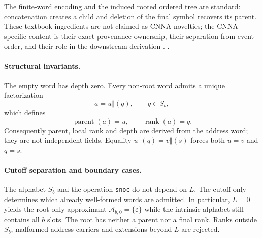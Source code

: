The finite-word encoding and the induced rooted ordered tree are standard:
concatenation creates a child and deletion of the final symbol recovers its
parent.  These textbook ingredients are not claimed as CNNA novelties; the
CNNA-specific content is their exact provenance ownership, their separation
from event order, and their role in the downstream derivation
\cite[Ch.~1 and free-monoid background]{Lothaire1997CombinatoricsWords}.
\cite[Ch.~1, The Basics]{Diestel2025GraphTheory}.

\paragraph*{Structural invariants.}
The empty word has depth zero.  Every non-root word admits a unique
factorization
\begin{equation}
  a=u\mathbin{\Vert}(q),
  \qquad q\in S_b,
  \label{eq:c003-unique-decomposition}
\end{equation}
which defines
\begin{equation}
  \operatorname{parent}(a)=u,
  \qquad \operatorname{rank}(a)=q.
  \label{eq:c003-parent-rank}
\end{equation}
Consequently parent, local rank and depth are derived from the address word;
they are not independent fields.  Equality
$u\mathbin{\Vert}(q)=v\mathbin{\Vert}(s)$ forces both $u=v$ and $q=s$.

\paragraph*{Cutoff separation and boundary cases.}
The alphabet $S_b$ and the operation \texttt{snoc} do not depend on $L$.
The cutoff only determines which already well-formed words are admitted.  In
particular, $L=0$ yields the root-only approximant
$\mathcal A_{b,0}=\{\varepsilon\}$ while the intrinsic alphabet still
contains all $b$ slots.  The root has neither a parent nor a final rank.
Ranks outside $S_b$, malformed address carriers and extensions beyond $L$ are
rejected.

